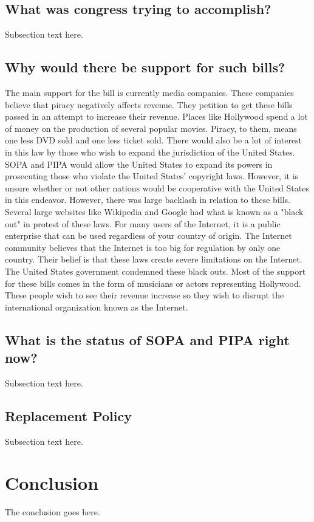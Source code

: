 \documentclass[11pt,journal,compsoc]{IEEEtran}
\begin{document}
\subsection{What was congress trying to accomplish?}
Subsection text here.

\subsection{Why would there be support for such bills?}
The main support for the bill is currently media companies. These companies believe that piracy negatively affects revenue. They petition to get these bills passed in an attempt to increase their revenue. Places like Hollywood spend a lot of money on the production of several popular movies. Piracy, to them, means one less DVD sold and one less ticket sold. There would also be a lot of interest in this law by those who wish to expand the jurisdiction of the United States. SOPA and PIPA would allow the United States to expand its powers in prosecuting those who violate the United States' copyright laws. However, it is unsure whether or not other nations would be cooperative with the United States in this endeavor. However, there was large backlash in relation to these bills. Several large websites like Wikipedia and Google had what is known as a "black out" in protest of these laws. For many users of the Internet, it is a public enterprise that can be used regardless of your country of origin. The Internet community believes that the Internet is too big for regulation by only one country. Their belief is that these laws create severe limitations on the Internet. The United States government condemned these black outs. Most of the support for these bills comes in the form of musicians or actors representing Hollywood. These people wish to see their revenue increase so they wish to disrupt the international organization known as the Internet.

\subsection{What is the status of SOPA and PIPA right now?}
Subsection text here.

\subsection{Replacement Policy}
Subsection text here.


\section{Conclusion}
The conclusion goes here.
\end{document}
